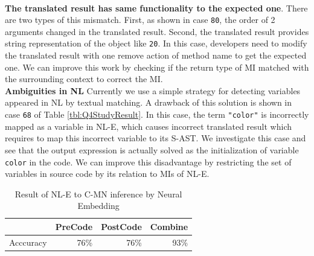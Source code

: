 \documentclass[sigconf,review,anonymous]{article}
\begin{document}
\\
\textbf{The translated result has same functionality to the expected one}. There are two types of this mismatch. First, as shown in case \texttt{80}, the order of 2 arguments changed in the translated result. Second, the translated result provides string representation of the object like \texttt{20}. In this case, developers need to modify the translated result with one remove action of method name to get the expected one. We can improve this work by checking if the return type of MI matched with the surrounding context to correct the MI.
\\
\textbf{Ambiguities in NL} Currently we use a simple strategy for detecting variables appeared in NL by textual matching. A drawback of this solution is shown in case \texttt{68} of Table \ref{tbl:Q4StudyResult}. In this case, the term \texttt{"color"} is incorrectly mapped as a variable in NL-E, which causes incorrect translated result which requires to map this incorrect variable to its S-AST. We investigate this case and see that the output expression is actually solved as the initialization of variable \texttt{color} in the code. We can improve this disadvantage by restricting the set of variables in source code by its relation to MIs of NL-E.  


\begin{table}[]
\caption{Result of NL-E to C-MN inference by Neural Embedding}
\label{tbl:Q2Result}
\centering
\begin{tabular}{|l|l|l|l|}
\hline
\textbf{} & \textbf{PreCode}          & \textbf{PostCode}         & \textbf{Combine}          \\ \hline
Acccuracy & \multicolumn{1}{r|}{76\%} & \multicolumn{1}{r|}{76\%} & \multicolumn{1}{r|}{93\%} \\ \hline
\end{tabular}
\end{table}
\end{document}
